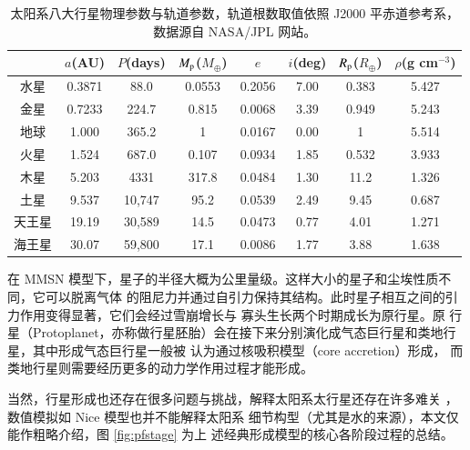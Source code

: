 \begin{table}[t]
\centering
\caption{太阳系八大行星物理参数与轨道参数，轨道根数取值依照 J2000 平赤道参考系，数据源自 NASA/JPL 网站。}
\label{tbl:solarsystem}
\begin{tabular}{cccccccc}
\hline \hline
  & $a$(AU) & $P$(days) & $M_\mathrm{p}$($M_\oplus$) &  $e$ &  $i$(deg) &  $R_\mathrm{p}$($R_\oplus$) & $\rho$(g cm$^{-3}$) \\ \hline
水星        &   0.3871    &   88.0      &  0.0553    & 0.2056  &  7.00    &   0.383   &   5.427      \\
金星        &   0.7233    &   224.7    &  0.815      & 0.0068  &  3.39    &   0.949   &   5.243      \\
地球        &   1.000      &   365.2     &  1            & 0.0167 &   0.00    &   1          &   5.514      \\
火星        &   1.524      &   687.0     &  0.107     & 0.0934 &   1.85    &   0.532   &   3.933      \\
木星        &   5.203      &   4331      &  317.8     & 0.0484  &  1.30    &   11.2     &   1.326      \\
土星        &    9.537     &   10,747   &  95.2       & 0.0539 &    2.49   &   9.45     &   0.687      \\
天王星     &   19.19     &    30,589   &  14.5       & 0.0473 &   0.77    &   4.01     &  1.271       \\
海王星     &   30.07     &    59,800   &  17.1       & 0.0086 &    1.77   &    3.88    &  1.638       \\
\hline \hline
\end{tabular}
\end{table}

在 MMSN 模型下，星子的半径大概为公里量级。这样大小的星子和尘埃性质不同，它可以脱离气体
的阻尼力并通过自引力保持其结构。此时星子相互之间的引力作用变得显著，它们会经过雪崩增长与
寡头生长两个时期成长为原行星\cite{Greenberg1978,Kokubo1996,Rafikov2003,Lissauer1993}。原
行星（Protoplanet，亦称做行星胚胎）会在接下来分别演化成气态巨行星和类地行星，其中形成气态巨行星一般被
认为通过核吸积模型（core accretion）形成\cite{Mizuno1980,BodenheimerPollack1986,Pollack1996}，
而类地行星则需要经历更多的动力学作用过程才能形成\cite{Chambers1998}。

当然，行星形成也还存在很多问题与挑战，解释太阳系太行星还存在许多难关
\cite{Walsh2011,Morbidelli2005}，数值模拟如 Nice 模型\cite{Gomes2005Nice}也并不能解释太阳系
细节构型（尤其是水的来源\cite{Raymond2009}），本文仅能作粗略介绍，图 \ref{fig:pfstage} 为上
述经典形成模型的核心各阶段过程的总结。

